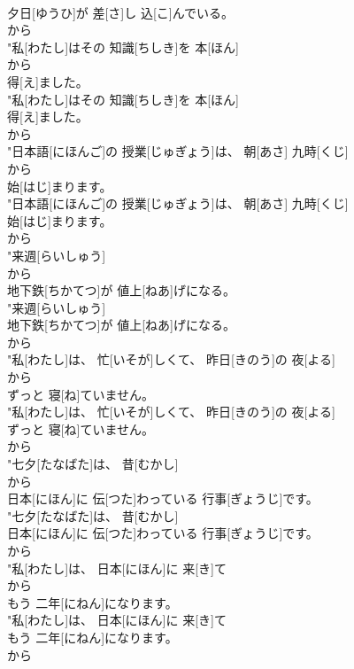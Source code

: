 \documentclass[8pt]{extreport}
\begin{document}
\begin{CJK}{UTF8}{min}
\\	夕日[ゆうひ]が 差[さ]し 込[こ]んでいる。
\\	から
\\	"私[わたし]はその 知識[ちしき]を 本[ほん]
\\	から
\\	得[え]ました。
\\	"私[わたし]はその 知識[ちしき]を 本[ほん]
\\	得[え]ました。
\\	から
\\	"日本語[にほんご]の 授業[じゅぎょう]は、 朝[あさ] 九時[くじ]
\\	から
\\	始[はじ]まります。
\\	"日本語[にほんご]の 授業[じゅぎょう]は、 朝[あさ] 九時[くじ]
\\	始[はじ]まります。
\\	から
\\	"来週[らいしゅう]
\\	から
\\	地下鉄[ちかてつ]が 値上[ねあ]げになる。
\\	"来週[らいしゅう]
\\	地下鉄[ちかてつ]が 値上[ねあ]げになる。
\\	から
\\	"私[わたし]は、 忙[いそが]しくて、 昨日[きのう]の 夜[よる]
\\	から
\\	ずっと 寝[ね]ていません。
\\	"私[わたし]は、 忙[いそが]しくて、 昨日[きのう]の 夜[よる]
\\	ずっと 寝[ね]ていません。
\\	から
\\	"七夕[たなばた]は、 昔[むかし]
\\	から
\\	日本[にほん]に 伝[つた]わっている 行事[ぎょうじ]です。
\\	"七夕[たなばた]は、 昔[むかし]
\\	日本[にほん]に 伝[つた]わっている 行事[ぎょうじ]です。
\\	から
\\	"私[わたし]は、 日本[にほん]に 来[き]て
\\	から
\\	もう 二年[にねん]になります。
\\	"私[わたし]は、 日本[にほん]に 来[き]て
\\	もう 二年[にねん]になります。
\\	から

\end{CJK}
\end{document}
